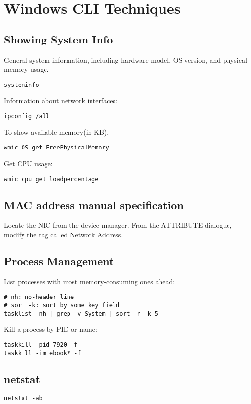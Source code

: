 \section{Windows CLI Techniques} 

\subsection{Showing System Info}

General system information, including hardware model, OS version, and physical memory usage.
\begin{verbatim}
systeminfo
\end{verbatim}

Information about network interfaces:
\begin{verbatim}
ipconfig /all
\end{verbatim}

To show available memory(in KB),
\begin{verbatim}
wmic OS get FreePhysicalMemory
\end{verbatim}

Get CPU usage:
\begin{verbatim}
wmic cpu get loadpercentage
\end{verbatim}

\subsection{MAC address manual specification}

Locate the NIC from the device manager.
From the ATTRIBUTE dialogue, modify the tag called Network Address. 


\subsection{Process Management}
List processes with most memory-consuming ones ahead:

\begin{verbatim}
# nh: no-header line
# sort -k: sort by some key field
tasklist -nh | grep -v System | sort -r -k 5
\end{verbatim}

Kill a process by PID or name:
\begin{verbatim}
taskkill -pid 7920 -f
taskkill -im ebook* -f
\end{verbatim}

\subsection{netstat}


\begin{verbatim}
netstat -ab
\end{verbatim}

